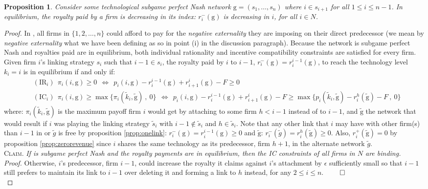 \documentclass{article}
\newtheorem{proposition}{Proposition}
\begin{document}
\begin{proposition}\label{monotonicity in royalty in the chain}
Consider some technological subgame perfect Nash network $\text{g}=(s_1,\ldots, s_n)$ where $i\in s_{i+1}$ for all $1\leq i\leq n-1$. In equilibrium, the royalty paid by a firm is decreasing in its index: $r^-_i(\text{g})$ is decreasing in $i$, for all $i\in N$.  
\end{proposition}  
\begin{proof}
In , all firms in $\{1,2,\ldots, n\}$ could afford to pay for the \textit{negative externality} they are imposing on their direct predecessor (we mean by \textit{negative externality} what we have been defining as so in point (i) in the discussion paragraph). Because the network  is subgame perfect Nash and royalties paid are in equilibrium, both individual rationality and incentive compatibility constraints are satisfied for every firm. Given firm $i$'s linking strategy $s_i$ such that $i-1\in s_i$, the royalty paid by $i$ to $i-1$, $r^-_i(\text{g})=r^{i-1}_{i}(\text{g}) $, to reach the technology level $k_i=i$ is in equilibrium if and only if: 
\begin{align*}
& (\text{IR}_i) ~~ \pi_i(i, \text{g})\geq 0~~\Leftrightarrow~~ p_i(i,\text{g})-r^{i-1}_i(\text{g})+r^{i}_{i+1}(\text{g})-F \geq 0\\
&  (\text{IC}_i) ~~ \pi_i(i, \text{g})\geq \max\{\pi_i(\tilde{k}_i,\tilde{\text{g}})~,~0\} ~~\Leftrightarrow~~ p_i(i,\text{g})-r^{i-1}_i(\text{g})+r^{i}_{i+1}(\text{g})-F \geq \max\{p_i(\tilde{k}_i,\tilde{\text{g}})-r^{h}_i(\tilde{\text{g}})-F~,~0\}
\end{align*}
where: $\pi_i(\tilde{k}_i,\tilde{\text{g}})$ is the maximum payoff firm $i$ would get by attaching to some firm $h<i-1$ instead of to $i-1$, and $\tilde{\text{g}}$ the network that would result if $i$ was playing the linking strategy $\tilde{s}_i$ with $i-1\notin \tilde{s}_i$ and $h\in \tilde{s}_i$. Note that any other link that $i$ may have with other firm(s) than $i-1$ in  or $\tilde{g}$ is free by proposition \ref{prop:onelink}: $r^-_i(\text{g})=r_i^{i-1}(\text{g})\geq 0$ and  $\tilde{\text{g}}$: $r^-_i(\tilde{g})=r^{h}_i(\tilde{\text{g}})\geq 0$. Also, $r^+_i(\tilde{\text{g}})=0$ by proposition \ref{prop:zerorevenue} since $i$ shares the same technology as its predecessor, firm $h+1$, in the alternate network $\tilde{g}$. \\

\indent \textsc{Claim.} \textit{If  is subgame perfect Nash and the royalty payments are in equilibrium, then the IC constraints of all firms in $N$ are binding.}\\
\indent \textit{Proof.} Otherwise, $i$'s predecessor, firm $i-1$, could increase the royalty it claims against $i$'s attachment by $\epsilon$ sufficiently small so that $i-1$ still prefers to maintain its link to $i-1$ over deleting it and forming a link to $h$ instead, for any $2\leq i\leq n$. $\qed$ \\


\end{proof}
\end{document}
